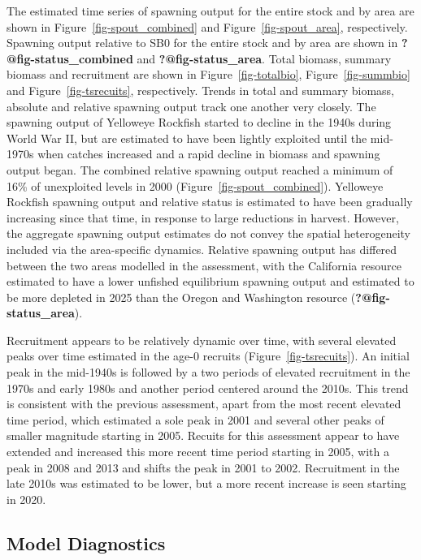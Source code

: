 \documentclass[
]{scrartcl}
\begin{document}
The estimated time series of spawning output for the entire stock and by
area are shown in Figure~\ref{fig-spout_combined} and
Figure~\ref{fig-spout_area}, respectively. Spawning output relative to
SB0 for the entire stock and by area are shown in
\textbf{?@fig-status\_combined} and \textbf{?@fig-status\_area}. Total
biomass, summary biomass and recruitment are shown in
Figure~\ref{fig-totalbio}, Figure~\ref{fig-summbio} and
Figure~\ref{fig-tsrecuits}, respectively. Trends in total and summary
biomass, absolute and relative spawning output track one another very
closely. The spawning output of Yelloweye Rockfish started to decline in
the 1940s during World War II, but are estimated to have been lightly
exploited until the mid-1970s when catches increased and a rapid decline
in biomass and spawning output began. The combined relative spawning
output reached a minimum of 16\% of unexploited levels in 2000
(Figure~\ref{fig-spout_combined}). Yelloweye Rockfish spawning output
and relative status is estimated to have been gradually increasing since
that time, in response to large reductions in harvest. However, the
aggregate spawning output estimates do not convey the spatial
heterogeneity included via the area-specific dynamics. Relative spawning
output has differed between the two areas modelled in the assessment,
with the California resource estimated to have a lower unfished
equilibrium spawning output and estimated to be more depleted in 2025
than the Oregon and Washington resource (\textbf{?@fig-status\_area}).

Recruitment appears to be relatively dynamic over time, with several
elevated peaks over time estimated in the age-0 recruits
(Figure~\ref{fig-tsrecuits}). An initial peak in the mid-1940s is
followed by a two periods of elevated recruitment in the 1970s and early
1980s and another period centered around the 2010s. This trend is
consistent with the previous assessment, apart from the most recent
elevated time period, which estimated a sole peak in 2001 and several
other peaks of smaller magnitude starting in 2005. Recuits for this
assessment appear to have extended and increased this more recent time
period starting in 2005, with a peak in 2008 and 2013 and shifts the
peak in 2001 to 2002. Recruitment in the late 2010s was estimated to be
lower, but a more recent increase is seen starting in 2020.

\subsection{Model Diagnostics}\label{model-diagnostics}
\end{document}
